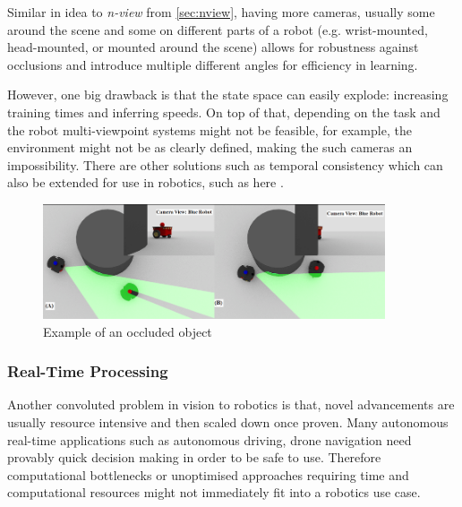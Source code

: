       Similar in idea to \emph{n-view} from \ref{sec:nview}, having more cameras, usually some around the scene and some on different parts of a robot (e.g. wrist-mounted, head-mounted, or mounted around the scene) allows for robustness against occlusions and introduce multiple different angles for efficiency in learning. 

      However, one big drawback is that the state space can easily explode: increasing training times and inferring speeds. On top of that, depending on the task and the robot multi-viewpoint systems might not be feasible, for example, the environment might not be as clearly defined, making the such cameras an impossibility. There are other solutions such as temporal consistency \cite{lai2018learningblindvideotemporal} which can also be extended for use in robotics, such as here \cite{billington2007using, yang2021reactive}.

      \begin{figure}[h]
        \centering
        \includegraphics[width=0.9\textwidth]{assets/background/occlusion.png}
        \caption{Example of an occluded object \cite{occlusionimage}}\label{fig:occlusion}
      \end{figure}

    \subsubsection{Real-Time Processing}
    Another convoluted problem in vision to robotics is that, novel advancements are usually resource intensive and then scaled down once proven. Many autonomous real-time  applications such as autonomous driving, drone navigation need provably quick decision making in order to be safe to use. Therefore computational bottlenecks or unoptimised approaches requiring time and computational resources might not immediately fit into a robotics use case.

